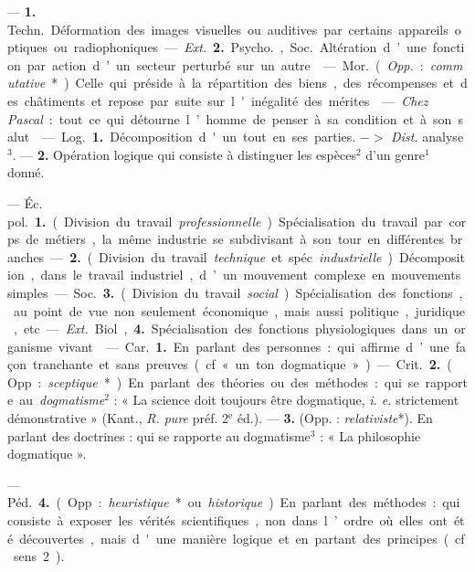 \begin{itemize}[leftmargin=1cm, label=, itemsep=1pt]
 — {\bf 1.} \si{Techn.} Déformation
des images visuelles ou auditives par
certains appareils optiques ou radiophoniques. — {\it Ext.} {\bf 2.} \si{Psycho.}, \si{Soc.}
Altération d’une fonction par action
d’un secteur perturbé sur un autre.

 — \si{Mor.} ({\it Opp.} :
{\it commutative}*). Celle qui préside à la
répartition des biens, des récompenses et des châtiments et repose
par suite sur l'inégalité des mérites.

 — {\it Chez Pascal} :
tout ce qui détourne l’homme de
penser à sa condition et à son salut.

 — \si{Log.} {\bf 1.} Décomposition
d'un tout en ses parties. $->$ {\it Dist.}
analyse$^3$. — {\bf 2.} Opération logique
qui consiste à distinguer les espèces$^2$
d'un genre$^1$ donné.

 — \si{Éc. pol.} {\bf 1.} (Division du travail
{\it professionnelle}). Spécialisation du travail par corps de
métiers, la même industrie se subdivisant à son tour en différentes
branches. — {\bf 2.} (Division du travail
{\it technique} et spéc. {\it industrielle}.) Décomposition, dans le travail industriel, d’un mouvement complexe en
mouvements simples.

— \si{Soc.} {\bf 3.} (Division du travail
{\it social}.) Spécialisation des fonctions,
au point de vue non seulement
économique, mais aussi politique,
juridique, etc.

— {\it Ext.} Biol, {\bf 4.} Spécialisation
des fonctions physiologiques dans un
organisme vivant.

 — \si{Car.} {\bf 1.} En parlant
des personnes : qui. affirme d’une
façon tranchante et sans preuves
(cf. « un ton dogmatique »).

— \si{Crit.} {\bf 2.} (Opp. : {\it sceptique}*). En
parlant des théories ou des méthodes : qui se rapporte au {\it dogmatisme}$^2$ : « La science doit toujours
être dogmatique, {\it i. e.} strictement
démonstrative » (Kant., {\it R. pure}
préf. 2$^\text{e}$ éd.). — {\bf 3.} (Opp. : {\it relativiste}*). En parlant des doctrines :
qui se rapporte au dogmatisme$^3$ :
« La philosophie dogmatique ».

— \si{Péd.} {\bf 4.} (Opp. : {\it heuristique}* ou
{\it historique}). En parlant des méthodes : qui consiste à exposer les vérités scientifiques, non dans l’ordre
où elles ont été découvertes, mais
d'une manière logique et en partant des principes (cf. sens 2).


\end{itemize}
